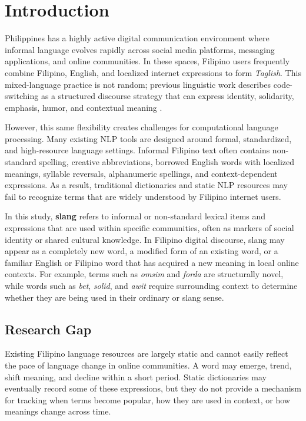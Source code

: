 \section{Introduction}

 Philippines has a highly active digital communication environment where informal language evolves rapidly across social media platforms, messaging applications, and online communities. In these spaces, Filipino users frequently combine Filipino, English, and localized internet expressions to form \textit{Taglish}. This mixed-language practice is not random; previous linguistic work describes code-switching as a structured discourse strategy that can express identity, solidarity, emphasis, humor, and contextual meaning \cite{b1,b2,b3}.

However, this same flexibility creates challenges for computational language processing. Many existing NLP tools are designed around formal, standardized, and high-resource language settings. Informal Filipino text often contains non-standard spelling, creative abbreviations, borrowed English words with localized meanings, syllable reversals, alphanumeric spellings, and context-dependent expressions. As a result, traditional dictionaries and static NLP resources may fail to recognize terms that are widely understood by Filipino internet users.

In this study, \textbf{slang} refers to informal or non-standard lexical items and expressions that are used within specific communities, often as markers of social identity or shared cultural knowledge. In Filipino digital discourse, slang may appear as a completely new word, a modified form of an existing word, or a familiar English or Filipino word that has acquired a new meaning in local online contexts. For example, terms such as \textit{omsim} and \textit{forda} are structurally novel, while words such as \textit{bet}, \textit{solid}, and \textit{awit} require surrounding context to determine whether they are being used in their ordinary or slang sense.

\subsection{Research Gap}
Existing Filipino language resources are largely static and cannot easily reflect the pace of language change in online communities. A word may emerge, trend, shift meaning, and decline within a short period. Static dictionaries may eventually record some of these expressions, but they do not provide a mechanism for tracking when terms become popular, how they are used in context, or how meanings change across time.


